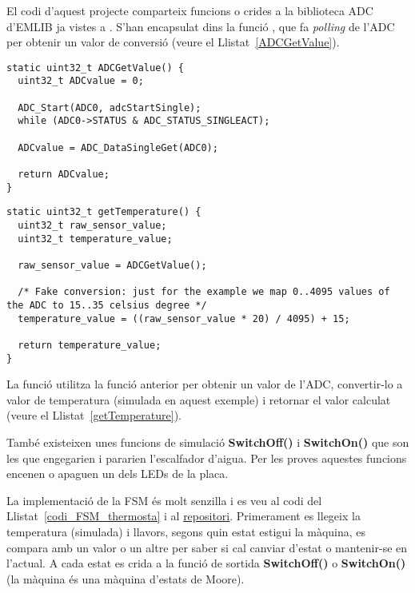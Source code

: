 El codi d'aquest projecte comparteix funcions o crides a la biblioteca \gls{ADC} d'EMLIB ja vistes a . S'han encapsulat dins la funció , que fa {\em polling} de l'ADC per obtenir un valor de conversió (veure el Llistat~\ref{ADCGetValue}).

\begin{lstlisting}[style=customc,caption=funció ADCGetValue(),label=ADCGetValue]
static uint32_t ADCGetValue() {
  uint32_t ADCvalue = 0;

  ADC_Start(ADC0, adcStartSingle);
  while (ADC0->STATUS & ADC_STATUS_SINGLEACT);
  
  ADCvalue = ADC_DataSingleGet(ADC0);

  return ADCvalue;
}
\end{lstlisting}

\begin{lstlisting}[style=customc,caption=funció getTemperature(),label=getTemperature]
static uint32_t getTemperature() {
  uint32_t raw_sensor_value;
  uint32_t temperature_value;

  raw_sensor_value = ADCGetValue();

  /* Fake conversion: just for the example we map 0..4095 values of the ADC to 15..35 celsius degree */
  temperature_value = ((raw_sensor_value * 20) / 4095) + 15;

  return temperature_value;
}
\end{lstlisting}

La funció  utilitza la funció anterior per obtenir un valor de l'ADC, convertir-lo a valor de temperatura (simulada en aquest exemple) i retornar el valor calculat (veure el Llistat~\ref{getTemperature}).

També existeixen unes funcions de simulació {\bf SwitchOff()} i {\bf SwitchOn()} que son les que engegarien i pararien l'escalfador d'aigua. Per les proves aquestes funcions encenen o apaguen un dels LEDs de la placa.

La implementació de la FSM és molt senzilla i es veu al codi del Llistat~\ref{codi_FSM_thermosta} i al \href{https://github.com/mariusmm/cursembedded/tree/master/Simplicity/FSM_1}{repositori}. Primerament es llegeix la temperatura (simulada) i llavors, segons quin estat estigui la màquina, es compara amb un valor o un altre per saber si cal canviar d'estat o mantenir-se en l'actual. A cada estat es crida a la funció de sortida {\bf SwitchOff()} o {\bf SwitchOn()} (la màquina és una màquina d'estats de Moore).

